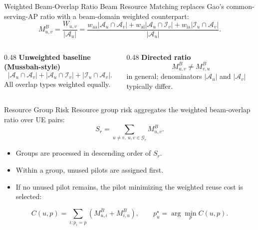 \documentclass[10pt,aspectratio=169]{beamer}
\newcommand{\BRM}{Beam Resource Matching}
\newcommand{\waa}{w_{\mathrm{aa}}}
\newcommand{\wai}{w_{\mathrm{ai}}}
\newcommand{\wia}{w_{\mathrm{ia}}}
\newenvironment{tightitemize}{%
    \begin{itemize}
        \setlength{\itemsep}{2pt}
        \setlength{\parskip}{0pt}
        \setlength{\parsep}{0pt}
}{%
    \end{itemize}
}
\begin{document}
\begin{frame}{Weighted Beam-Overlap Ratio}
    \small
    \BRM{} replaces Gao's common-serving-AP ratio with a beam-domain weighted counterpart:
    \[
        M_{u,v}^{B}
        =
        \frac{W_{u,v}}{|\mathcal{A}_u|}
        =
        \frac{
            \waa|\mathcal{A}_u\cap\mathcal{A}_v|
            +
            \wai|\mathcal{A}_u\cap\mathcal{I}_v|
            +
            \wia|\mathcal{I}_u\cap\mathcal{A}_v|
        }{|\mathcal{A}_u|}.
    \]
    
    \vspace{0.5em}
    \begin{columns}[T,onlytextwidth]
        \begin{column}{0.48\textwidth}
            \textbf{Unweighted baseline (Mussbah-style)}
            \[
                |\mathcal{A}_u\cap\mathcal{A}_v|
                +
                |\mathcal{A}_u\cap\mathcal{I}_v|
                +
                |\mathcal{I}_u\cap\mathcal{A}_v|.
            \]
            All overlap types weighted equally.
        \end{column}
        \begin{column}{0.48\textwidth}
            \textbf{Directed ratio}
            \[
                M_{u,v}^{B}\neq M_{v,u}^{B}
            \]
            in general; denominators \(|\mathcal{A}_u|\) and \(|\mathcal{A}_v|\) typically differ.
        \end{column}
    \end{columns}
\end{frame}

\begin{frame}{Resource Group Risk}
    \small
    Resource group risk aggregates the weighted beam-overlap ratio over UE pairs:
    \[
        S_r
        =
        \sum_{u\neq v,\ u,v\in\mathcal{G}_r}
        M_{u,v}^{B}.
    \]
    
    \vspace{0.5em}
    \begin{tightitemize}
        \item Groups are processed in descending order of \(S_r\).
        \item Within a group, unused pilots are assigned first.
        \item If no unused pilot remains, the pilot minimizing the weighted reuse cost is selected:
    \end{tightitemize}
    
    \vspace{0.4em}
    \[
        C(u,p)
        =
        \sum_{i:p_i=p}
        \left(M_{u,i}^{B}+M_{i,u}^{B}\right),
        \qquad
        p_u^{\star}=\arg\min_{p} C(u,p).
    \]
\end{frame}
\end{document}
